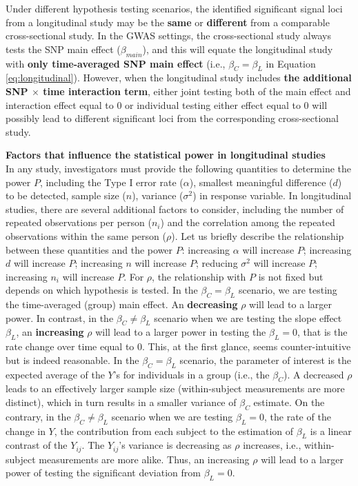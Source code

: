 \documentclass[12pt]{article}
\begin{document}
Under different hypothesis testing scenarios, the identified significant signal loci from a longitudinal study may be the \textbf{same} or \textbf{different} from a comparable cross-sectional study. In the GWAS settings, the cross-sectional study always tests the SNP main effect ($\beta_{main}$), and this will equate the longitudinal study with \textbf{only time-averaged SNP main effect} (i.e., $\beta_C = \beta_L$ in Equation \ref{eq:longitudinal}). However, when the longitudinal study includes \textbf{the additional SNP $\times$ time interaction term}, either joint testing both of the main effect and interaction effect equal to 0 or individual testing either effect equal to 0 will possibly lead to different significant loci from the corresponding cross-sectional study.

\textbf{Factors that influence the statistical power in longitudinal studies}\\
In any study, investigators must provide the following quantities to determine the power $P$, including the Type I error rate ($\alpha$), smallest meaningful difference ($d$) to be detected, sample size ($n$), variance ($\sigma^2$) in response variable. In longitudinal studies, there are several additional factors to consider, including the number of repeated observations per person ($n_i$) and the correlation among the repeated observations within the same person ($\rho$). Let us briefly describe the relationship between these quantities and the power $P$: increasing $\alpha$ will increase $P$; increasing $d$ will increase $P$; increasing $n$ will increase $P$; reducing $\sigma^2$ will increase $P$; increasing $n_i$ will increase $P$. For $\rho$, the relationship with $P$ is not fixed but depends on which hypothesis is tested. In the $\beta_C = \beta_L$ scenario, we are testing the time-averaged (group) main effect. An \textbf{decreasing} $\rho$ will lead to a larger power. In contrast, in the $\beta_C \neq \beta_L$ scenario when we are testing the slope effect $\beta_L$, an \textbf{increasing} $\rho$ will lead to a larger power in testing the $\beta_L = 0$, that is the rate change over time equal to 0. This, at the first glance, seems counter-intuitive but is indeed reasonable. In the $\beta_C = \beta_L$ scenario, the parameter of interest is the expected average of the $Y$'s for individuals in a group (i.e., the $\beta_C$). A decreased $\rho$ leads to an effectively larger sample size (within-subject measurements are more distinct), which in turn results in a smaller variance of $\beta_C$ estimate. On the contrary, in the $\beta_C \neq \beta_L$ scenario when we are testing $\beta_L = 0$, the rate of the change in $Y$, the contribution from each subject to the estimation of $\beta_L$ is a linear contrast of the $Y_{ij}$. The $Y_{ij}$'s variance is decreasing as $\rho$ increases, i.e., within-subject measurements are more alike. Thus, an increasing $\rho$ will lead to a larger power of testing the significant deviation from $\beta_L = 0$.
\end{document}
